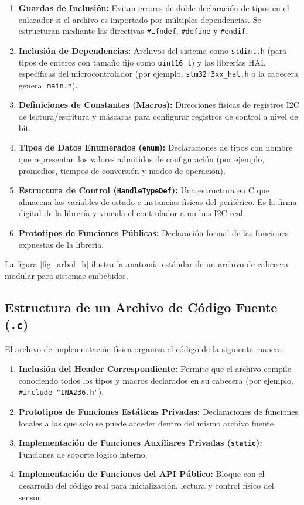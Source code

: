 \documentclass[
10pt, %
a4paper, %
oneside, %
headinclude,footinclude, %
BCOR5mm, %
]{scrartcl}
\begin{document}
\begin{enumerate}
	\item \textbf{Guardas de Inclusión:} Evitan errores de doble declaración de tipos en el enlazador si el archivo es importado por múltiples dependencias. Se estructuran mediante las directivas \texttt{\#ifndef}, \texttt{\#define} y \texttt{\#endif}.
	\item \textbf{Inclusión de Dependencias:} Archivos del sistema como \texttt{stdint.h} (para tipos de enteros con tamaño fijo como \texttt{uint16\_t}) y las librerías HAL específicas del microcontrolador (por ejemplo, \texttt{stm32f3xx\_hal.h} o la cabecera general \texttt{main.h}).
	\item \textbf{Definiciones de Constantes (Macros):} Direcciones físicas de registros I2C de lectura/escritura y máscaras para configurar registros de control a nivel de bit.
	\item \textbf{Tipos de Datos Enumerados (\texttt{enum}):} Declaraciones de tipos con nombre que representan los valores admitidos de configuración (por ejemplo, promedios, tiempos de conversión y modos de operación).
	\item \textbf{Estructura de Control (\texttt{HandleTypeDef}):} Una estructura en C que almacena las variables de estado e instancias físicas del periférico. Es la firma digital de la librería y vincula el controlador a un bus I2C real.
	\item \textbf{Prototipos de Funciones Públicas:} Declaración formal de las funciones expuestas de la librería.
\end{enumerate}

La figura \ref{fig_arbol_h} ilustra la anatomía estándar de un archivo de cabecera modular para sistemas embebidos.



\subsection{Estructura de un Archivo de Código Fuente (\texttt{.c})}
El archivo de implementación física organiza el código de la siguiente manera:

\begin{enumerate}
	\item \textbf{Inclusión del Header Correspondiente:} Permite que el archivo compile conociendo todos los tipos y macros declarados en su cabecera (por ejemplo, \texttt{\#include "INA236.h"}).
	\item \textbf{Prototipos de Funciones Estáticas Privadas:} Declaraciones de funciones locales a las que solo se puede acceder dentro del mismo archivo fuente.
	\item \textbf{Implementación de Funciones Auxiliares Privadas (\texttt{static}):} Funciones de soporte lógico interno.
	\item \textbf{Implementación de Funciones del API Público:} Bloque con el desarrollo del código real para inicialización, lectura y control físico del sensor.
\end{enumerate}
\end{document}
